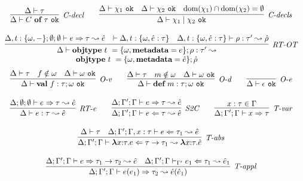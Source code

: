 \begin{figure}
\[\begin{array}{c}
\infer[\textit{C-decl}]
	{\Delta \vdash  C~\keyw{of}~\tau~\texttt{ok}} 
	{\Delta \vdash \tau   }
~~~~~~
\infer[\textit{C-decls}]
	{\Delta \vdash  \chi_1 \bnfalt \chi_2~\texttt{ok}} 
	{\Delta \vdash \chi_1~\texttt{ok} & \Delta \vdash \chi_2~\texttt{ok} & \text{dom}(\chi_1) \intersect \text{dom}(\chi_2) = \emptyset}\\[3ex]

\infer[\textit{RT-OT}]
          {\renewcommand{\arraystretch}{1}
	    \begin{array}{c}
	    \Delta \vdash  \keyw{objtype}~ t~=\{{\omega}, \keyw{metadata}=e\}; \rho: \tau'\leadsto\\
            \keyw{objtype}~ t~=\{{\omega}, \keyw{metadata}=\hat{e}\}; \hat{\rho}
            \end{array}
       }
	  {\Delta, t:\{\omega,-\}; \emptyset; \emptyset \vdash e \Rightarrow \tau \leadsto \hat{e} & \vdash \Delta, t:\{\omega,\hat{e} : \tau\} & \Delta, t:\{\omega, \hat e:\tau\} \vdash \rho :\tau'\leadsto \hat{\rho} }
	   \\[3ex] 
\infer[\textit{O-v}]
	{\Delta \vdash \keyw{val}~ f:\tau; \omega \ \texttt{ok} }
	{\Delta \vdash \tau & f \notin \omega & \Delta \vdash \omega \ \texttt{ok} }
~~~~~~	
\infer[\textit{O-d}]
	{\Delta \vdash \keyw{def}~ m:\tau; \omega \ \texttt{ok} }
	{\Delta \vdash \tau & m \notin \omega & \Delta \vdash \omega \ \texttt{ok} }
~~~~~~
\infer[\textit{O-e}]
	{\Delta \vdash \epsilon \ \texttt{ok}}
	{ }\\[3ex]

\infer[\textit{RT-e}]
	{\Delta \vdash  e:\tau \leadsto \hat{e}} 
	{\Delta; \emptyset; \emptyset \vdash e \Rightarrow \tau \leadsto \hat{e}}
~~~~~~	
\infer[\textit{S2C}]
	{\Delta; \Gamma'; \Gamma \vdash  e \Leftarrow \tau \leadsto \hat{e}} 
	{\Delta; \Gamma'; \Gamma \vdash e \Rightarrow \tau \leadsto \hat{e}   }
~~~~~~
\infer[\textit{T-var}]
	{\Delta; \Gamma'; \Gamma \vdash x\Rightarrow\tau } 
	{x:\tau \in \Gamma }\\[3ex]

\infer[\textit{T-abs}]
	{\Delta; \Gamma'; \Gamma \vdash  \boldsymbol\lambda x{:}\tau . e \Leftarrow \tau \rightarrow \tau_1 \leadsto \boldsymbol\lambda x{:}\tau .\hat{e}} 
	{\Delta\vdash \tau & \Delta; \Gamma'; \Gamma, x:\tau \vdash e\Leftarrow \tau_1 \leadsto \hat{e}}\\[3ex]

\infer[\textit{T-appl}]
	{\Delta; \Gamma'; \Gamma \vdash  e(e_1) \Rightarrow \tau_2  \leadsto \hat{e}(\hat{e}_1) } 
	{\Delta; \Gamma'; \Gamma \vdash e \Rightarrow \tau_1 \rightarrow \tau_2  \leadsto \hat{e}  & \Delta; \Gamma'; \Gamma \vdash_{\Gamma'} e_1 \Leftarrow \tau_1 \leadsto \hat{e}_1 }\\[3ex]


\end{array}\]
\end{figure}
